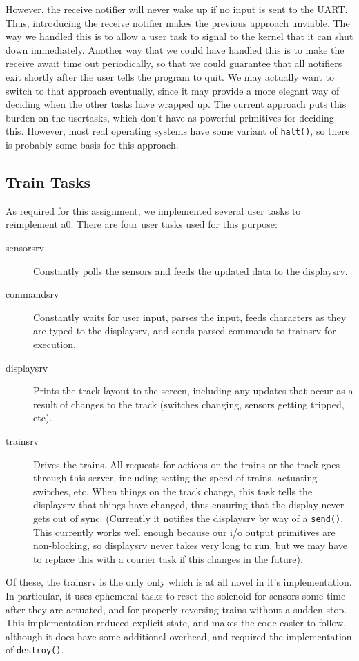 \documentclass[titlepage]{article}
\begin{document}
However, the receive notifier will never wake up if no input is sent to the UART.
Thus, introducing the receive notifier makes the previous approach unviable.
The way we handled this is to allow a user task to signal to the kernel that it
can shut down immediately.
Another way that we could have handled this is to make the receive await time out
periodically, so that we could guarantee that all notifiers exit shortly after
the user tells the program to quit.
We may actually want to switch to that approach eventually, since it may provide
a more elegant way of deciding when the other tasks have wrapped up.
The current approach puts this burden on the usertasks, which don't have as powerful
primitives for deciding this.
However, most real operating systems have some variant of \texttt{halt()},
so there is probably some basis for this approach.

\subsection{Train Tasks}
As required for this assignment, we implemented several user tasks to
reimplement a0. There are four user tasks used for this purpose:
\begin{description}
\item[sensorsrv] Constantly polls the sensors and feeds the updated data to
	the displaysrv.
\item[commandsrv] Constantly waits for user input, parses the input, feeds
	characters as they are typed to the displaysrv, and sends parsed commands
	to trainsrv for execution.
\item[displaysrv] Prints the track layout to the screen, including any updates
	that occur as a result of changes to the track (switches changing, sensors
	getting tripped, etc).
\item[trainsrv] Drives the trains. All requests for actions on the trains or
	the track goes through this server, including setting the speed of trains,
	actuating switches, etc. When things on the track change, this task tells
	the displaysrv that things have changed, thus ensuring that the display
	never gets out of sync. (Currently it notifies the displaysrv by way of
	a \texttt{send()}. This currently works well enough because our i/o output
	primitives are non-blocking, so displaysrv never takes very long to run,
	but we may have to replace this with a courier task if this changes in
	the future).
\end{description}
Of these, the trainsrv is the only only which is at all novel in it's
implementation. In particular, it uses ephemeral tasks to reset the solenoid
for sensors some time after they are actuated, and for properly reversing
trains without a sudden stop. This implementation reduced explicit state, and
makes the code easier to follow, although it does have some additional
overhead, and required the implementation of \texttt{destroy()}.
\end{document}
